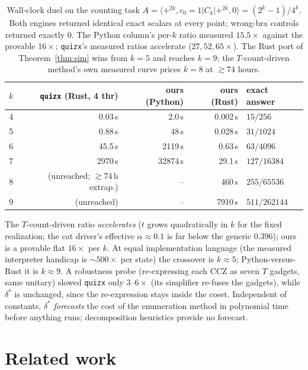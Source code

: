 \documentclass[11pt]{article}
\theoremstyle{definition}
\theoremstyle{remark}
\newcommand{\ds}{\delta^{*}}
\newcommand{\code}[1]{\texttt{#1}}
\begin{document}
\begin{table}[ht]
\centering
\caption{Wall-clock duel on the counting task $A=\langle+^{2k},c_0{=}1|C_k|+^{2k},0\rangle=(2^k-1)/4^k$. Both
engines returned identical exact scalars at every point; wrong-bra controls returned exactly $0$.
The Python column's per-$k$ ratio measured $15.5\times$ against the provable $16\times$; \code{quizx}'s measured
ratios accelerate ($27,52,65\times$). The Rust port of Theorem~\ref{thm:sim} wins from $k=5$ and reaches $k=9$;
the $T$-count-driven method's own measured curve prices $k=8$ at $\gtrsim74$ hours.}\label{tab:duel}
\smallskip
\begin{tabular}{rrrrl}
\toprule
$k$ & \code{quizx} (Rust, 4 thr) & ours (Python) & ours (Rust) & exact answer\\
\midrule
4 & 0.03\,s & 2.0\,s & 0.002\,s & $15/256$\\
5 & 0.88\,s & 48\,s & 0.028\,s & $31/1024$\\
6 & 45.5\,s & 2119\,s & 0.63\,s & $63/4096$\\
7 & 2970\,s & 32874\,s & 29.1\,s & $127/16384$\\
8 & (unreached; $\gtrsim74$\,h extrap.) & -- & 460\,s & $255/65536$\\
9 & (unreached) & -- & 7910\,s & $511/262144$\\
\bottomrule
\end{tabular}
\end{table}

The $T$-count-driven ratio \emph{accelerates} ($t$ grows quadratically in $k$ for the fixed realization;
the cat driver's effective $\alpha\approx0.1$ is far below the generic $0.396$); ours is a provable flat $16\times$ per
$k$. At equal implementation language (the measured interpreter handicap is $\sim500\times$ per state)
the crossover is $k\approx5$; Python-versus-Rust it is $k\approx9$. A robustness probe (re-expressing each
CCZ as seven $T$ gadgets, same unitary) slowed \code{quizx} only $3$--$6\times$ (its simplifier re-fuses the
gadgets), while $\ds$ is unchanged, since the re-expression stays inside the coset. Independent of constants, $\ds$ \emph{forecasts} the cost
of the enumeration method in polynomial time before anything runs; decomposition heuristics provide no forecast.

\section{Related work}\label{sec:related}
\end{document}

